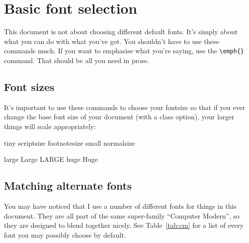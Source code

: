\documentclass[12pt,article]{memoir}
\begin{document}
\chapter*{Basic font selection}

This document is not about choosing different default fonts. It's simply about what you can do with what you've got. You shouldn't have to use these commands much. If you want to emphasise what you're saying, use the \verb|\emph{}| command. That should be all you need in prose.

\section*{Font sizes}

It's important to use these commands to choose your fontsize so that if you ever change the base font size of your document (with a class option), your larger things will scale appropriately:

\begin{center}
	\tiny tiny
	\scriptsize scriptsize
	\footnotesize footnotesize
	\small small
	\normalsize normalsize
	
	\large large
	\Large Large
	\LARGE LARGE
	\huge huge
	\Huge Huge
\end{center}

\section*{Matching alternate fonts}

You may have noticed that I use a number of different fonts for things in this document. They are all part of the same super-family ``Computer Modern'', so they are designed to blend together nicely. See Table~\ref{tab:cm} for a list of every font you may possibly choose by default.
\end{document}
